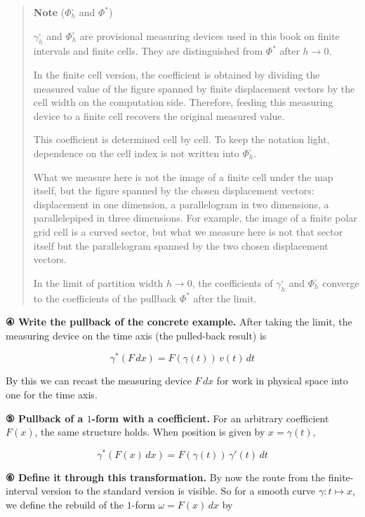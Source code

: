 \begin{quote}
\textbf{Note} (\(\Phi_h^\square\) and \(\Phi^*\))

\(\gamma_h^\square\) and \(\Phi_h^\square\) are provisional measuring
devices used in this book on finite intervals and finite cells. They are
distinguished from \(\Phi^*\) after \(h\to0\).

In the finite cell version, the coefficient is obtained by dividing the
measured value of the figure spanned by finite displacement vectors by
the cell width on the computation side. Therefore, feeding this
measuring device to a finite cell recovers the original measured value.

This coefficient is determined cell by cell. To keep the notation light,
dependence on the cell index is not written into \(\Phi_h^\square\).

What we measure here is not the image of a finite cell under the map
itself, but the figure spanned by the chosen displacement vectors:
displacement in one dimension, a parallelogram in two dimensions, a
parallelepiped in three dimensions. For example, the image of a finite
polar grid cell is a curved sector, but what we measure here is not that
sector itself but the parallelogram spanned by the two chosen
displacement vectors.

In the limit of partition width \(h\to0\), the coefficients of
\(\gamma_h^\square\) and \(\Phi_h^\square\) converge to the coefficients
of the pullback \(\Phi^*\) after the limit.
\end{quote}

\textbf{④ Write the pullback of the concrete example.} After taking the
limit, the measuring device on the time axis (the pulled-back result) is

\[\gamma^*(F\,dx) = F(\gamma(t))\,v(t)\,dt\]

By this we can recast the measuring device \(F\,dx\) for work in
physical space into one for the time axis.

\textbf{⑤ Pullback of a $1$-form with a coefficient.} For an arbitrary
coefficient \(F(x)\), the same structure holds. When position is given
by \(x = \gamma(t)\),

\[
\gamma^*(F(x)\,dx)
=
F(\gamma(t))\,\gamma'(t)\,dt
\]

\textbf{⑥ Define it through this transformation.} By now the route from
the finite-interval version to the standard version is visible. So for a
smooth curve \(\gamma: t \mapsto x\), we define the rebuild of the
\(1\)-form \(\omega = F(x)\,dx\) by

